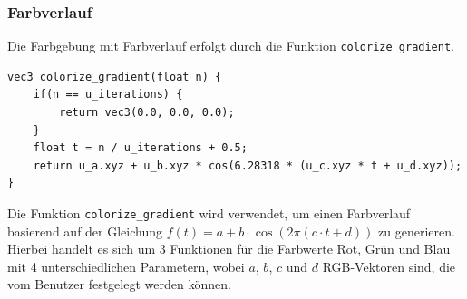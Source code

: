 \subsubsection{Farbverlauf}
Die Farbgebung mit Farbverlauf erfolgt durch die Funktion
\texttt{colorize\_gradient}.
\begin{verbatim}
vec3 colorize_gradient(float n) {
    if(n == u_iterations) {
        return vec3(0.0, 0.0, 0.0);
    }
    float t = n / u_iterations + 0.5;
    return u_a.xyz + u_b.xyz * cos(6.28318 * (u_c.xyz * t + u_d.xyz));
}
\end{verbatim}
\noindent
Die Funktion \texttt{colorize\_gradient} wird verwendet, um einen Farbverlauf basierend auf der Gleichung $f(t) = a + b \cdot \cos(2\pi(c \cdot t + d))$ \cite{InigoQui32:online} zu generieren. Hierbei handelt es sich um 3 Funktionen für die Farbwerte Rot, Grün und Blau mit 4 unterschiedlichen Parametern, wobei $a$, $b$, $c$ und $d$ RGB-Vektoren sind, die vom Benutzer festgelegt werden können.

